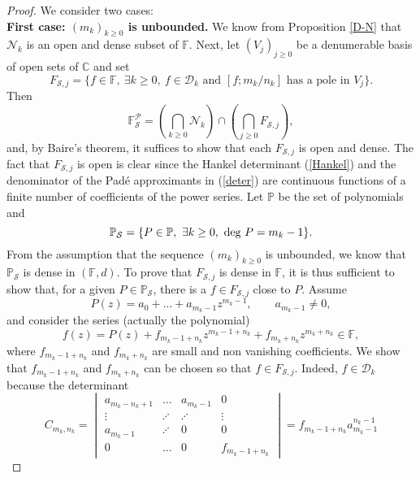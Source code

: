 \documentclass[12pt]{amsart}
\numberwithin{equation}{section}
\begin{document}
\begin{proof}
We consider two cases:\\
{\bf First case: $(m_{k})_{k\geq 0}$ is unbounded.}
We know from Proposition \ref{D-N} that ${\mathcal N}_{k}$ is an open and dense subset of ${\mathbb F}$.
Next, let $(V_{j})_{j\geq 0}$ be a denumerable basis of open sets of ${\mathbb{C}}$ and set
\begin{equation}\label{def-Fj}
F_{{\mathcal S},j}=\{f\in{\mathbb F},~\exists k\geq 0,~f\in{\mathcal D}_{k}\text{ and }[f;m_{k}/n_{k}]\text{ has a pole in }V_{j}\}.
\end{equation}
Then 
$${\mathbb F}^{\mathcal P}_{\mathcal S}=(\bigcap_{k\geq 0}{\mathcal N}_{k})\cap(\bigcap_{j\geq 0}F_{{\mathcal S},j}),$$ 
and, by Baire's theorem, it suffices to show that each $F_{{\mathcal S},j}$ is open and dense. The fact that $F_{{\mathcal S},j}$ is open is clear since the Hankel determinant (\ref{Hankel}) and the denominator of the Pad\'e approximants in (\ref{deter}) are continuous functions of a finite number of coefficients of the power series. Let ${\mathbb{P}}$ be the set of polynomials and
$${\mathbb{P}}_{\mathcal S}=\{P\in{\mathbb{P}},~\exists k\geq 0,~{\mbox{{\rm deg} }} P=m_{k}-1\}.$$
From the assumption that the sequence $(m_{k})_{k\geq 0}$ is unbounded, we know that ${\mathbb{P}}_{\mathcal S}$ is dense in $({\mathbb F},d)$. To prove that $F_{{\mathcal S},j}$ is dense in ${\mathbb F}$, it is thus sufficient to show that, for a given $P\in{\mathbb{P}}_{\mathcal S}$, there is a $f\in F_{{\mathcal S},j}$ close to $P$. Assume 
$$P(z)=a_{0}+\ldots+a_{m_{k}-1}z^{m_{k}-1},\qquad a_{m_{k}-1}\neq 0,$$
and consider the series (actually the polynomial)
\begin{equation}\label{def-f}
f(z)=P(z)+f_{m_{k}-1+n_{k}}z^{m_{k}-1+n_{k}}+f_{m_{k}+n_{k}}z^{m_{k}+n_{k}}\in{\mathbb F},\end{equation}
where $f_{m_{k}-1+n_{k}}$ and $f_{m_{k}+n_{k}}$ are small and non vanishing coefficients.
We show that $f_{m_{k}-1+n_{k}}$ and $f_{m_{k}+n_{k}}$ can be chosen so that $f\in F_{{\mathcal S},j}$. Indeed, $f\in{\mathcal D}_{k}$ because the determinant
$$C_{m_{k},n_{k}}=\begin{vmatrix}a_{m_{k}-n_{k}+1} & \ldots & a_{m_{k}-1} & 0\\
\vdots & \iddots & \iddots & \vdots\\
a_{m_{k}-1} & \iddots & 0 & 0\\
0 & \ldots & 0 & f_{m_{k}-1+n_{k}}\end{vmatrix}=f_{m_{k}-1+n_{k}}a_{m_{k}-1}^{n_{k}-1}$$

\end{proof}
\end{document}
